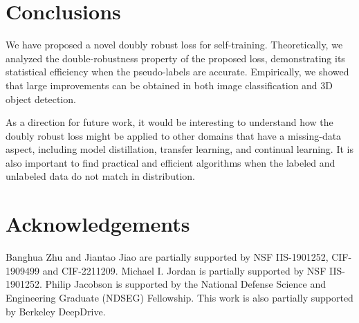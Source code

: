 \section{Conclusions}

We have proposed a novel doubly robust loss for self-training. Theoretically, we analyzed the double-robustness property of the proposed loss, demonstrating its statistical efficiency when the pseudo-labels are accurate. Empirically, we showed that large improvements can be obtained in both image classification and 3D object detection.

As a direction for future work, it would be interesting to understand how the doubly robust loss might be applied to other domains that have a missing-data aspect, including model distillation, transfer learning, and continual learning. It is also important to find practical and efficient algorithms when the labeled and unlabeled data do not match in distribution. 


\section*{Acknowledgements}
Banghua Zhu and Jiantao 
Jiao are partially supported by NSF IIS-1901252, CIF-1909499 and CIF-2211209. Michael I. Jordan is partially supported by NSF IIS-1901252. Philip Jacobson is supported by the National Defense Science and Engineering Graduate (NDSEG) Fellowship. This work is also partially supported by Berkeley DeepDrive. 






